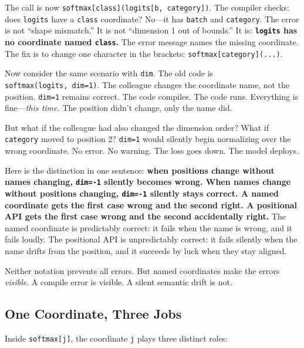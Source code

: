 \documentclass[11pt,titlepage]{article}
\begin{document}
The call is now \texttt{softmax{[}class{]}(logits{[}b,\ category{]})}.
The compiler checks: does \texttt{logits} have a \texttt{class}
coordinate? No---it has \texttt{batch} and \texttt{category}. The error
is not ``shape mismatch.'' It is not ``dimension 1 out of bounds.'' It
is: \textbf{\texttt{logits} has no coordinate named \texttt{class}.} The
error message names the missing coordinate. The fix is to change one
character in the brackets: \texttt{softmax{[}category{]}(...)}.

Now consider the same scenario with \texttt{dim}. The old code is
\texttt{softmax(logits,\ dim=1)}. The colleague changes the coordinate
name, not the position. \texttt{dim=1} remains correct. The code
compiles. The code runs. Everything is fine---\emph{this time.} The
position didn't change, only the name did.

But what if the colleague had also changed the dimension order? What if
\texttt{category} moved to position 2? \texttt{dim=1} would silently
begin normalizing over the wrong coordinate. No error. No warning. The
loss goes down. The model deploys.

Here is the distinction in one sentence: \textbf{when positions change
without names changing, \texttt{dim=-1} silently becomes wrong. When
names change without positions changing, \texttt{dim=-1} silently stays
correct. A named coordinate gets the first case wrong and the second
right. A positional API gets the first case wrong and the second
accidentally right.} The named coordinate is predictably correct: it
fails when the name is wrong, and it fails loudly. The positional API is
unpredictably correct: it fails silently when the name drifts from the
position, and it succeeds by luck when they stay aligned.

Neither notation prevents all errors. But named coordinates make the
errors \emph{visible}. A compile error is visible. A silent semantic
drift is not.

\vspace{2em}

\hypertarget{one-coordinate-three-jobs}{%
\subsection{One Coordinate, Three
Jobs}\label{one-coordinate-three-jobs}}

Inside \texttt{softmax{[}j{]}}, the coordinate \texttt{j} plays three
distinct roles:
\end{document}
